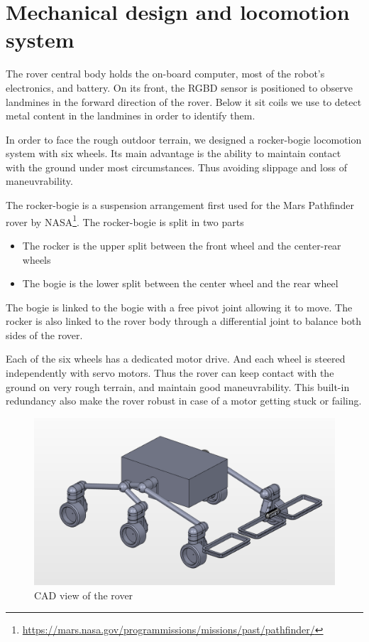 \section{Mechanical design and locomotion system}
The rover central body holds the on-board computer, most of the robot's electronics, and battery.
On its front, the RGBD sensor is positioned to observe landmines in the forward direction of the rover.
Below it sit coils we use to detect metal content in the landmines in order to identify them.

In order to face the rough outdoor terrain, we designed a rocker-bogie locomotion system with six wheels.
Its main advantage is the ability to maintain contact with the ground under most circumstances.
Thus avoiding slippage and loss of maneuvrability.

The rocker-bogie is a suspension arrangement first used for the Mars Pathfinder rover by NASA\footnote{\url{https://mars.nasa.gov/programmissions/missions/past/pathfinder/}}.
The rocker-bogie is split in two parts
\begin{itemize}
    \item The rocker is the upper split between the front wheel and the center-rear wheels
    \item The bogie is the lower split between the center wheel and the rear wheel
\end{itemize}
The bogie is linked to the bogie with a free pivot joint allowing it to move.
The rocker is also linked to the rover body through a differential joint to balance both sides of the rover.

Each of the six wheels has a dedicated motor drive.
And each wheel is steered independently with servo motors.
Thus the rover can keep contact with the ground on very rough terrain, and maintain good maneuvrability.
This built-in redundancy also make the rover robust in case of a motor getting stuck or failing.

\begin{figure}[htbp]
   \caption{\label{fig:rover} CAD view of the rover}
   \includegraphics[width=\textwidth]{images/rover}
\end{figure}

